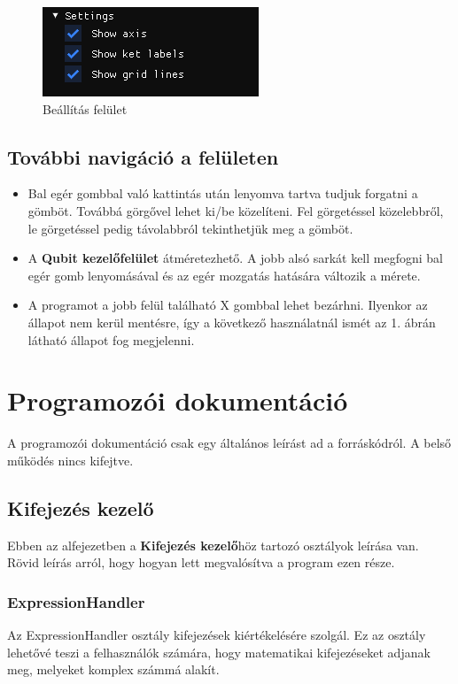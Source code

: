 \documentclass[fontsize=12pt,a4paper]{article}
\begin{document}
\begin{figure}[h]
    \centering
    \includegraphics[width=0.4\linewidth]{App/settings.png}
    \caption{Beállítás felület}
\end{figure}

\subsection{További navigáció a felületen}
\begin{itemize}
\item Bal egér gombbal való kattintás után lenyomva tartva tudjuk forgatni a gömböt. Továbbá görgővel lehet ki/be közelíteni. Fel görgetéssel közelebbről, le görgetéssel pedig távolabbról tekinthetjük meg a gömböt. 
\item A \textbf{Qubit kezelőfelület} átméretezhető. A jobb alsó sarkát kell megfogni bal egér gomb lenyomásával és az egér mozgatás hatására változik a mérete. 
\item A programot a jobb felül található X gombbal lehet bezárhni. Ilyenkor az állapot nem kerül mentésre, így a következő használatnál ismét az 1. ábrán látható állapot fog megjelenni.
\end{itemize}

\newpage
\section{Programozói dokumentáció}

A programozói dokumentáció csak egy általános leírást ad a forráskódról. A belső működés nincs kifejtve. %

\subsection{Kifejezés kezelő}
Ebben az alfejezetben a \textbf{Kifejezés kezelő}höz tartozó osztályok leírása van. Rövid leírás arról, hogy hogyan lett megvalósítva a program ezen része.

\subsubsection{ExpressionHandler}
Az ExpressionHandler osztály kifejezések kiértékelésére szolgál. Ez az osztály lehetővé teszi a felhasználók számára, hogy matematikai kifejezéseket adjanak meg, melyeket komplex számmá alakít.
\end{document}
